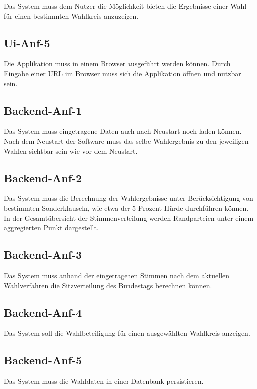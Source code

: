 \documentclass[a4paper]{scrreprt}
\begin{document}
Das System muss dem Nutzer die Möglichkeit bieten die Ergebnisse einer Wahl für einen bestimmten Wahlkreis anzuzeigen. 

\subsection{Ui-Anf-5}

Die Applikation muss in einem Browser ausgeführt werden können. Durch Eingabe einer URL im Browser muss sich die Applikation öffnen und nutzbar sein.

\subsection{Backend-Anf-1}

Das System muss eingetragene Daten auch nach Neustart noch laden können. Nach dem Neustart der Software muss das selbe Wahlergebnis zu den jeweiligen Wahlen sichtbar sein wie vor dem Neustart. 

\subsection{Backend-Anf-2}

Das System muss die Berechnung der Wahlergebnisse unter Berücksichtigung von bestimmten Sonderklauseln, wie etwa der 5-Prozent Hürde durchführen können. In der Gesamtübersicht der Stimmenverteilung werden Randparteien unter einem aggregierten Punkt dargestellt.  

\subsection{Backend-Anf-3}

Das System muss anhand der eingetragenen Stimmen nach dem aktuellen Wahlverfahren die Sitzverteilung des Bundestags berechnen können.

\subsection{Backend-Anf-4}

Das System soll die Wahlbeteiligung für einen ausgewählten Wahlkreis anzeigen. \\

\subsection{Backend-Anf-5}

Das System muss die Wahldaten in einer Datenbank persistieren. \\
\end{document}
